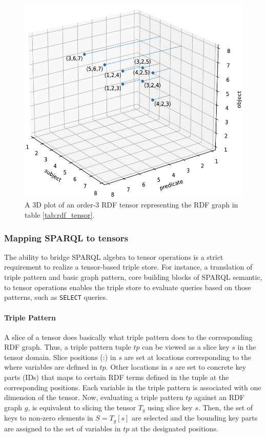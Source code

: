 \begin{figure}[h]
	\centering
	\includegraphics{figures/chapter2/3Dcoord-cut}
	\caption{A 3D plot of an order-3 RDF tensor representing the RDF graph in table \ref{tab:rdf_tensor}.}
	\label{fig:rdf_tensor}
\end{figure}

\subsubsection{Mapping SPARQL to tensors}
The ability to bridge SPARQL algebra to tensor operations is a strict requirement to realize a tensor-based triple store. For instance, a translation of triple pattern and basic graph pattern, core building blocks of SPARQL semantic, to tensor operations enables the triple store to evaluate queries based on those patterns, such as \verb|SELECT| queries. 

\paragraph{Triple Pattern} A slice of a tensor does basically what triple pattern does to the corresponding RDF graph. Thus, a triple pattern tuple $tp$ can be viewed as a slice key $s$ in the tensor domain. Slice positions ($\textbf{:}$) in $s$ are set at locations corresponding to the where variables are defined in $tp$.  Other locations in $s$ are set to concrete key parts (IDs) that maps to certain RDF terms defined in the tuple at the corresponding positions. Each variable in the triple pattern is associated with one dimension of the tensor. Now, evaluating a triple pattern $tp$ against an RDF graph $g$, is equivalent to slicing the tensor $T_{g}$ using slice key $s$. Then, the set of keys to non-zero elements in $S = T_{g}[s]$ are selected and the bounding key parts are assigned to the set of variables in $tp$ at the designated positions. \\


